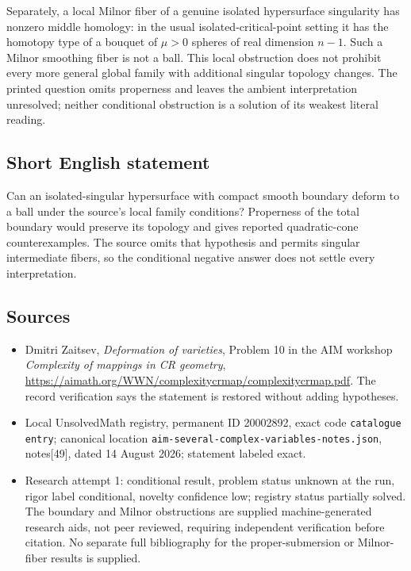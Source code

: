 \documentclass[11pt]{article}
\begin{document}
Separately, a local Milnor fiber of a genuine isolated hypersurface singularity has nonzero middle homology: in the usual isolated-critical-point setting it has the homotopy type of a bouquet of \(\mu>0\) spheres of real dimension \(n-1\). Such a Milnor smoothing fiber is not a ball. This local obstruction does not prohibit every more general global family with additional singular topology changes. The printed question omits properness and leaves the ambient interpretation unresolved; neither conditional obstruction is a solution of its weakest literal reading.
\subsection{Short English statement}
Can an isolated-singular hypersurface with compact smooth boundary deform to a ball under the source's local family conditions? Properness of the total boundary would preserve its topology and gives reported quadratic-cone counterexamples. The source omits that hypothesis and permits singular intermediate fibers, so the conditional negative answer does not settle every interpretation.
\subsection{Sources}
\begin{itemize}
\item Dmitri Zaitsev, \emph{Deformation of varieties}, Problem 10 in the AIM workshop \emph{Complexity of mappings in CR geometry}, \url{https://aimath.org/WWN/complexitycrmap/complexitycrmap.pdf}. The record verification says the statement is restored without adding hypotheses.
\item Local UnsolvedMath registry, permanent ID 20002892, exact code \texttt{catalogue entry}; canonical location \texttt{aim-several-complex-variables-notes.json}, notes[49], dated 14 August 2026; statement labeled exact.
\item Research attempt 1: conditional result, problem status unknown at the run, rigor label conditional, novelty confidence low; registry status partially solved. The boundary and Milnor obstructions are supplied machine-generated research aids, not peer reviewed, requiring independent verification before citation. No separate full bibliography for the proper-submersion or Milnor-fiber results is supplied.
\end{itemize}
\end{document}
